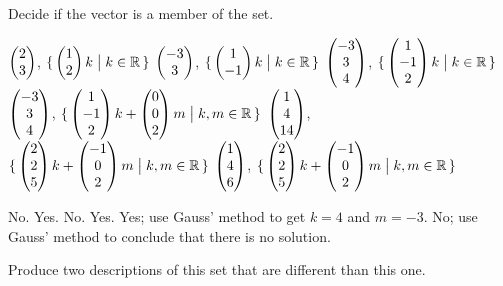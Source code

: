 \begin{exercises}
  \item 
    Decide if the vector is a member of the set.
    \begin{exparts}
      \partsitem $\begin{pmatrix} 2 \\ 3 \end{pmatrix}$, 
         $\mbox{$\{\,\begin{pmatrix} 1 \\ 2 \end{pmatrix}k\bigm| k\in\mathbb{R}\,\}$}$
      \partsitem $\begin{pmatrix} -3 \\ 3 \end{pmatrix}$, 
         $\mbox{$\{\,\begin{pmatrix} 1 \\ -1 \end{pmatrix}k\bigm| k\in\mathbb{R}\,\}$}$
      \partsitem $\begin{pmatrix} -3 \\ 3 \\ 4 \end{pmatrix}$, 
             $\mbox{$\{\,\begin{pmatrix} 1 \\ -1 \\ 2 \end{pmatrix}k\bigm| k\in\mathbb{R}\,\}$}$
      \partsitem $\begin{pmatrix} -3 \\ 3 \\ 4 \end{pmatrix}$, 
             $\mbox{$\{\,\begin{pmatrix} 1 \\ -1 \\ 2 \end{pmatrix}k+\begin{pmatrix} 0 \\ 0 \\ 2 \end{pmatrix}m
                \bigm| k,m\in\mathbb{R}\,\}$}$
      \partsitem $\begin{pmatrix} 1 \\ 4 \\ 14 \end{pmatrix}$, 
             $\mbox{$\{\,\begin{pmatrix} 2 \\ 2 \\ 5 \end{pmatrix}k+\begin{pmatrix} -1 \\ 0 \\ 2 \end{pmatrix}m
                \bigm| k,m\in\mathbb{R}\,\}$}$
      \partsitem $\begin{pmatrix} 1 \\ 4 \\ 6 \end{pmatrix}$, 
             $\mbox{$\{\,\begin{pmatrix} 2 \\ 2 \\ 5 \end{pmatrix}k+\begin{pmatrix} -1 \\ 0 \\ 2 \end{pmatrix}m
                \bigm| k,m\in\mathbb{R}\,\}$}$
    \end{exparts}
    \begin{answer}
      \begin{exparts}
        \partsitem No.
        \partsitem Yes.
        \partsitem No.
        \partsitem Yes.
        \partsitem Yes; use Gauss' method to get $k=4$ and $m=-3$.
        \partsitem No; use Gauss' method to conclude that there is no solution.
      \end{exparts}
    \end{answer}
  \item 
     Produce two descriptions of this set that are different than this one. 

\end{exercises}
